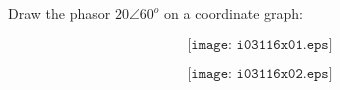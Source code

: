 

Draw the phasor $20 \angle 60^o$ on a coordinate graph:

$$\texttt{[image: i03116x01.eps]}$$







$$\texttt{[image: i03116x02.eps]}$$











